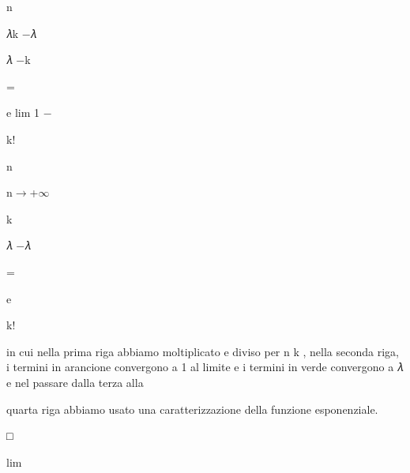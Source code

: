 \documentclass[a4paper,portrait,12pt]{article}
\begin{document}
\begin{flushleft}
n
\end{flushleft}


\begin{flushleft}
𝜆k $-$𝜆
\end{flushleft}


\begin{flushleft}
𝜆 $-$k
\end{flushleft}


=


\begin{flushleft}
e lim 1 $-$
\end{flushleft}


\begin{flushleft}
k!
\end{flushleft}


\begin{flushleft}
n
\end{flushleft}


\begin{flushleft}
n$\rightarrow$+$\infty$
\end{flushleft}


\begin{flushleft}
k
\end{flushleft}


\begin{flushleft}
𝜆 $-$𝜆
\end{flushleft}


=


\begin{flushleft}
e
\end{flushleft}


\begin{flushleft}
k!
\end{flushleft}


\begin{flushleft}
in cui nella prima riga abbiamo moltiplicato e diviso per n k , nella seconda riga, i termini in arancione convergono a 1 al limite e i termini in verde convergono a 𝜆 e nel passare dalla terza alla
\end{flushleft}


\begin{flushleft}
quarta riga abbiamo usato una caratterizzazione della funzione esponenziale.
\end{flushleft}


□


\begin{flushleft}
lim
\end{flushleft}
\end{document}
